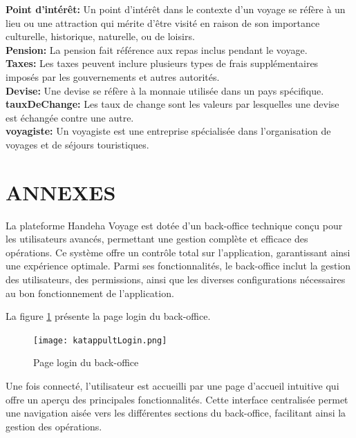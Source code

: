 \documentclass[12pt]{report}
\begin{document}
			\textbf{Point d'intérêt:} Un point d'intérêt dans le contexte d'un voyage se réfère à un lieu ou une attraction qui mérite d'être visité en raison de son importance culturelle, historique, naturelle, ou de loisirs.\\
			\textbf{Pension:} La pension fait référence aux repas inclus pendant le voyage.\\
			\textbf{Taxes:} Les taxes peuvent inclure plusieurs types de frais supplémentaires imposés par les gouvernements et autres autorités.\\
			\textbf{Devise:} Une devise se réfère à la monnaie utilisée dans un pays spécifique.\\
			\textbf{tauxDeChange:} Les taux de change sont les valeurs par lesquelles une devise est échangée contre une autre.\\
			\textbf{voyagiste:} Un voyagiste est une entreprise spécialisée dans l'organisation de voyages et de séjours touristiques.



			\chapter*{ANNEXES}
			
			\hspace{15pt} La plateforme Handeha Voyage est dotée d'un back-office technique conçu pour les utilisateurs avancés, permettant une gestion complète et efficace des opérations. Ce système offre un contrôle total sur l'application, garantissant ainsi une expérience optimale. Parmi ses fonctionnalités, le back-office inclut la gestion des utilisateurs, des permissions, ainsi que les diverses configurations nécessaires au bon fonctionnement de l'application.

			La figure \ref{fig:katappultLogin} présente la page login du back-office.

			\begin{figure}[h]
				\centering
				\texttt{[image: katappultLogin.png]}
				\caption{Page login du back-office}
				\label{fig:katappultLogin}
			\end{figure}
			\FloatBarrier

			Une fois connecté, l'utilisateur est accueilli par une page d'accueil intuitive qui offre un aperçu des principales fonctionnalités. Cette interface centralisée permet une navigation aisée vers les différentes sections du back-office, facilitant ainsi la gestion des opérations.
\end{document}

